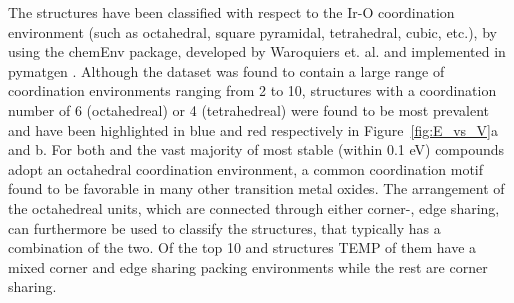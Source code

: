 %
The structures have been classified with respect to the Ir-O coordination environment (such as octahedral, square pyramidal, tetrahedral, cubic, etc.),
by using the chemEnv package, developed by Waroquiers et. al. \cite{Waroquiers2017} and implemented in pymatgen \cite{Ong2013}.
%
Although the dataset was found to contain a large range of coordination environments ranging from 2 to 10,
structures with a coordination number of 6 (octahedreal) or 4 (tetrahedreal) were found to be most prevalent
and have been highlighted in blue and red respectively in Figure~\ref{fig:E_vs_V}a and b.
%
For both \IrOtwo and \IrOthree the vast majority of most stable (within 0.1 eV) compounds adopt an octahedral coordination environment, a common coordination motif found to be favorable in many other transition metal oxides.\cite{Waroquiers2017}
%
The arrangement of the octahedreal units, which are connected through either corner-, edge sharing,
can furthermore be used to classify the structures, that typically has a combination of the two.
%
Of the top 10 \IrOtwo and \IrOthree structures TEMP of them have a mixed corner and edge sharing packing environments while the rest are corner sharing.

